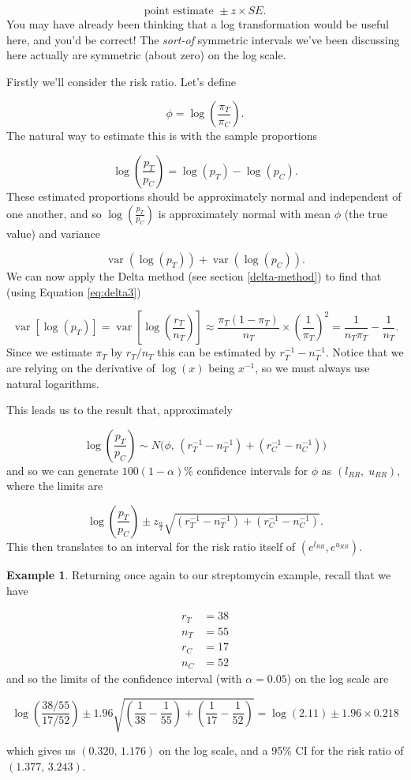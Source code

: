 \documentclass[
  openany]{book}
\theoremstyle{definition}
\theoremstyle{definition}
\newtheorem{example}{Example}[chapter]
\theoremstyle{definition}
\theoremstyle{definition}
\theoremstyle{remark}
\begin{document}
\[\text{point estimate } \pm{z\times{SE}}.\]
You may have already been thinking that a log transformation would be useful here, and you'd be correct! The \emph{sort-of} symmetric intervals we've been discussing here actually are symmetric (about zero) on the log scale.

Firstly we'll consider the risk ratio. Let's define

\[ \phi = \log\left(\frac{\pi_T}{\pi_C}\right).\]
The natural way to estimate this is with the sample proportions

\[\log\left(\frac{p_T}{p_C}\right) = \log\left(p_T\right) - \log\left(p_C\right).\]
These estimated proportions should be approximately normal and independent of one another, and so \(\log\left(\frac{p_T}{p_C}\right)\) is approximately normal with mean \(\phi\) (the true value) and variance

\[\operatorname{var}\left(\log\left(p_T\right)\right) + \operatorname{var}\left(\log\left(p_C\right)\right). \]
We can now apply the Delta method (see section \ref{delta-method}) to find that (using Equation \eqref{eq:delta3})

\[\operatorname{var}\left[\log\left(p_T\right)\right] = \operatorname{var}\left[\log\left(\frac{r_T}{n_T}\right)\right] \approx \frac{\pi_T\left(1-\pi_T\right)}{n_T}\times{\left(\frac{1}{\pi_T}\right)^2} = \frac{1}{n_T\pi_T} - \frac{1}{n_T}. \]
Since we estimate \(\pi_T\) by \(r_T/n_T\) this can be estimated by \(r_T^{-1} - n_T^{-1}\). Notice that we are relying on the derivative of \(\log\left(x\right)\) being \(x^{-1}\), so we must always use natural logarithms.

This leads us to the result that, approximately

\[\log\left(\frac{p_T}{p_C}\right) \sim N\bigg(\phi,\,\left(r_T^{-1} - n_T^{-1}\right) + \left(r_C^{-1} - n_C^{-1}\right) \bigg) \] and so we can generate \(100\left(1-\alpha\right)\)\% confidence intervals for \(\phi\) as \(\left(l_{RR},\;u_{RR}\right)\), where the limits are

\[
\log\left(\frac{p_T}{p_C}\right) \pm z_{\frac{\alpha}{2}}\sqrt{\left(r_T^{-1} - n_T^{-1}\right) + \left(r_C^{-1} - n_C^{-1}\right)}.
\]
This then translates to an interval for the risk ratio itself of \(\left(e^{l_{RR}},e^{u_{RR}}\right)\).

\begin{example}
Returning once again to our streptomycin example, recall that we have

\[
\begin{aligned}
r_T & = 38\\
n_T & = 55 \\
r_C & = 17 \\
n_C & = 52
\end{aligned}
\]
and so the limits of the confidence interval (with \(\alpha=0.05\)) on the log scale are

\[\log\left(\frac{38/55}{17/52}\right) \pm 1.96\sqrt{\left(\frac{1}{38} - \frac{1}{55}\right) + \left(\frac{1}{17} - \frac{1}{52}\right)} = \log(2.11) \pm 1.96 \times 0.218\]

which gives us \(\left(0.320,\,1.176\right)\) on the log scale, and a 95\% CI for the risk ratio of \(\left(1.377,\,3.243\right)\).
\end{example}
\end{document}
